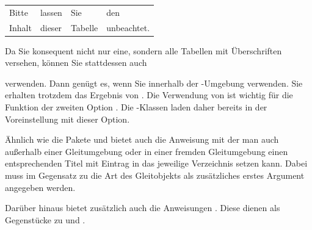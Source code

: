 \begin{Example}
\begin{ShowOutput}
\begin{tabular}{llll}
      Bitte & lassen & Sie & den \\
      Inhalt & dieser & Tabelle & unbeachtet.
    \end{tabular}
  \end{ShowOutput}
  Da Sie konsequent nicht nur eine, sondern alle Tabellen mit Überschriften
  versehen, können Sie stattdessen auch
\begin{lstcode}
  \usepackage[enablepatch=caption,tablecaptionabove]{tocbasic}
\end{lstcode}
  verwenden. Dann genügt es, wenn Sie innerhalb der
  -Umgebung  verwenden.  Sie erhalten
  trotzdem das Ergebnis von . Die Verwendung von
   ist wichtig für die
  Funktion der zweiten Option
  . Die \KOMAScript-Klassen laden
   daher bereits in der Voreinstellung mit dieser Option.
\end{Example}
\EndIndexGroup
\ExampleEndFix

\begin{Declaration}
\end{Declaration}
Ähnlich wie die Pakete  und
 bietet auch  die
Anweisung  mit der man auch außerhalb einer
Gleitumgebung oder in einer fremden Gleitumgebung einen entsprechenden Titel
mit Eintrag in das jeweilige Verzeichnis setzen kann. Dabei muss im Gegensatz
zu  die Art des Gleitobjekts als zusätzliches
erstes Argument angegeben werden.

Darüber hinaus bietet  zusätzlich auch die Anweisungen
. Diese dienen als Gegenstücke zu
 und
.

